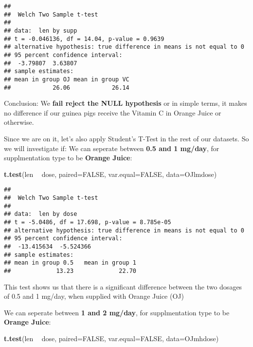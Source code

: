 \documentclass[]{article}
\newenvironment{Shaded}{\begin{snugshade}}{\end{snugshade}}
\newcommand{\DataTypeTok}[1]{\textcolor[rgb]{0.13,0.29,0.53}{#1}}
\newcommand{\KeywordTok}[1]{\textcolor[rgb]{0.13,0.29,0.53}{\textbf{#1}}}
\newcommand{\NormalTok}[1]{#1}
\newcommand{\OperatorTok}[1]{\textcolor[rgb]{0.81,0.36,0.00}{\textbf{#1}}}
\newcommand{\OtherTok}[1]{\textcolor[rgb]{0.56,0.35,0.01}{#1}}
\newcommand{\StringTok}[1]{\textcolor[rgb]{0.31,0.60,0.02}{#1}}
\begin{document}
\begin{verbatim}
## 
##  Welch Two Sample t-test
## 
## data:  len by supp
## t = -0.046136, df = 14.04, p-value = 0.9639
## alternative hypothesis: true difference in means is not equal to 0
## 95 percent confidence interval:
##  -3.79807  3.63807
## sample estimates:
## mean in group OJ mean in group VC 
##            26.06            26.14
\end{verbatim}

Conclusion: We \textbf{fail reject the NULL hypothesis} or in simple
terms, it makes no difference if our guinea pigs receive the Vitamin C
in Orange Juice or otherwise.

Since we are on it, let's also apply Student's T-Test in the rest of our
datasets. So we will investigate if: We can seperate between \textbf{0.5
and 1 mg/day}, for supplmentation type to be \textbf{Orange Juice}:

\begin{Shaded}
\begin{Highlighting}[]
\KeywordTok{t.test}\NormalTok{(len }\OperatorTok{~}\StringTok{ }\NormalTok{dose, }\DataTypeTok{paired=}\OtherTok{FALSE}\NormalTok{, }\DataTypeTok{var.equal=}\OtherTok{FALSE}\NormalTok{, }\DataTypeTok{data=}\NormalTok{OJlmdose)}
\end{Highlighting}
\end{Shaded}

\begin{verbatim}
## 
##  Welch Two Sample t-test
## 
## data:  len by dose
## t = -5.0486, df = 17.698, p-value = 8.785e-05
## alternative hypothesis: true difference in means is not equal to 0
## 95 percent confidence interval:
##  -13.415634  -5.524366
## sample estimates:
## mean in group 0.5   mean in group 1 
##             13.23             22.70
\end{verbatim}

This test shows us that there is a significant difference between the
two dosages of 0.5 and 1 mg/day, when supplied with Orange Juice (OJ)

We can seperate between \textbf{1 and 2 mg/day}, for supplmentation type
to be \textbf{Orange Juice}:

\begin{Shaded}
\begin{Highlighting}[]
\KeywordTok{t.test}\NormalTok{(len }\OperatorTok{~}\StringTok{ }\NormalTok{dose, }\DataTypeTok{paired=}\OtherTok{FALSE}\NormalTok{, }\DataTypeTok{var.equal=}\OtherTok{FALSE}\NormalTok{, }\DataTypeTok{data=}\NormalTok{OJmhdose)}
\end{Highlighting}
\end{Shaded}
\end{document}
